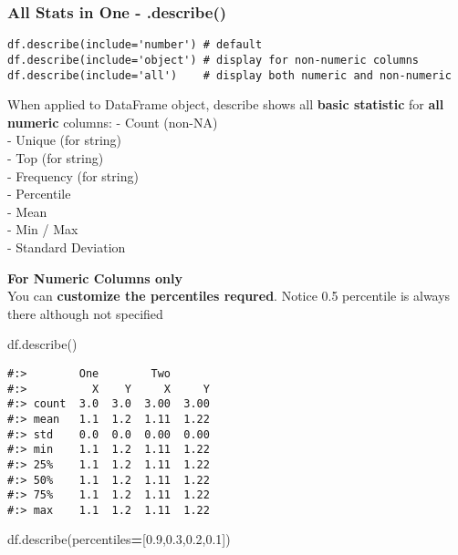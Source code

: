 \documentclass[
]{book}
\newenvironment{Shaded}{\begin{snugshade}}{\end{snugshade}}
\newcommand{\FloatTok}[1]{\textcolor[rgb]{0.06,0.06,0.06}{#1}}
\newcommand{\NormalTok}[1]{#1}
\newcommand{\OperatorTok}[1]{\textcolor[rgb]{0.43,0.43,0.43}{\textbf{#1}}}
\begin{document}
\hypertarget{all-stats-in-one---.describe}{%
\subsubsection{All Stats in One - .describe()}\label{all-stats-in-one---.describe}}

\begin{verbatim}
df.describe(include='number') # default
df.describe(include='object') # display for non-numeric columns
df.describe(include='all')    # display both numeric and non-numeric
\end{verbatim}

When applied to DataFrame object, describe shows all \textbf{basic statistic} for \textbf{all numeric} columns: - Count (non-NA)\\
- Unique (for string)\\
- Top (for string)\\
- Frequency (for string)\\
- Percentile\\
- Mean\\
- Min / Max\\
- Standard Deviation

\textbf{For Numeric Columns only}\\
You can \textbf{customize the percentiles requred}. Notice 0.5 percentile is always there although not specified

\begin{Shaded}
\begin{Highlighting}[]
\NormalTok{df.describe()}
\end{Highlighting}
\end{Shaded}

\begin{verbatim}
#:>        One        Two      
#:>          X    Y     X     Y
#:> count  3.0  3.0  3.00  3.00
#:> mean   1.1  1.2  1.11  1.22
#:> std    0.0  0.0  0.00  0.00
#:> min    1.1  1.2  1.11  1.22
#:> 25%    1.1  1.2  1.11  1.22
#:> 50%    1.1  1.2  1.11  1.22
#:> 75%    1.1  1.2  1.11  1.22
#:> max    1.1  1.2  1.11  1.22
\end{verbatim}

\begin{Shaded}
\begin{Highlighting}[]
\NormalTok{df.describe(percentiles}\OperatorTok{=}\NormalTok{[}\FloatTok{0.9}\NormalTok{,}\FloatTok{0.3}\NormalTok{,}\FloatTok{0.2}\NormalTok{,}\FloatTok{0.1}\NormalTok{])}
\end{Highlighting}
\end{Shaded}
\end{document}
